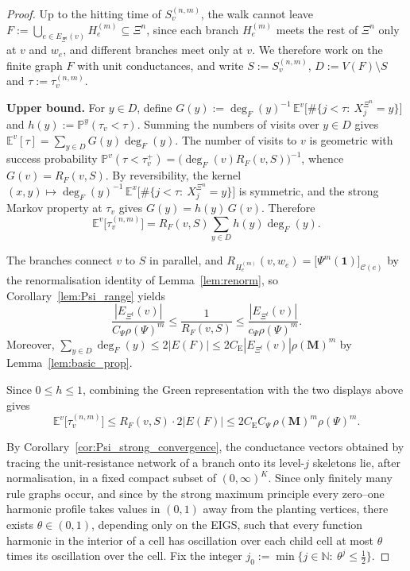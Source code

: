 \documentclass{article}
\theoremstyle{plain}
\theoremstyle{definition}
\begin{document}
\begin{proof}
%

Up to the hitting time of $S_v^{(n,m)}$, the walk cannot leave $F:=\bigcup_{e\in E_{\Xi^{t}}(v)} H_e^{(m)}\subseteq \Xi^n$, since each branch $H_e^{(m)}$ meets the rest of $\Xi^n$ only at $v$ and $w_e$, and different branches meet only at $v$.
We therefore work on the finite graph $F$ with unit conductances, and write $S:=S_v^{(n,m)}$, $D:=V(F)\setminus S$ and $\tau:=\tau_v^{(n,m)}$.

\textbf{Upper bound.}
For $y\in D$, define $G(y):=\deg_F(y)^{-1}\,\mathbb E^v\big[\#\{j<\tau:\ X_j^{\Xi^n}=y\}\big]$ and $h(y):=\mathbb P^y(\tau_v<\tau)$.
Summing the numbers of visits over $y\in D$ gives $\mathbb E^v[\tau]=\sum_{y\in D}G(y)\deg_F(y)$.
The number of visits to $v$ is geometric with success probability $\mathbb P^v(\tau<\tau_v^+)=\big(\deg_F(v)R_F(v,S)\big)^{-1}$, whence $G(v)=R_F(v,S)$.
By reversibility, the kernel $(x,y)\mapsto\deg_F(y)^{-1}\,\mathbb E^x\big[\#\{j<\tau:\ X_j^{\Xi^n}=y\}\big]$ is symmetric, and the strong Markov property at $\tau_v$ gives $G(y)=h(y)\,G(v)$.
Therefore
\[
\mathbb E^v\big[\tau_v^{(n,m)}\big]
=
R_F(v,S)\sum_{y\in D}h(y)\deg_F(y).
\]


The branches connect $v$ to $S$ in parallel, and $R_{H_e^{(m)}}(v,w_e)=\big[\Psi^{m}(\mathbf 1)\big]_{\mathscr C(e)}$ by the renormalisation identity of Lemma~\ref{lem:renorm}, so Corollary~\ref{lem:Psi_range} yields
\[
\frac{|E_{\Xi^{t}}(v)|}{C_{\Psi}\rho(\Psi)^m}
\le
\frac{1}{R_F(v,S)}
\le
\frac{|E_{\Xi^{t}}(v)|}{c_{\Psi}\rho(\Psi)^m}.
\]
Moreover, $\sum_{y\in D}\deg_F(y)\le 2|E(F)|\le 2C_{\mathrm E}|E_{\Xi^{t}}(v)|\rho(\mathbf M)^m$ by Lemma~\ref{lem:basic_prop}.


Since $0\le h\le 1$, combining the Green representation with the two displays above gives
\[
\mathbb E^v\big[\tau_v^{(n,m)}\big]
\le
R_F(v,S)\cdot 2|E(F)|
\le
2C_{\mathrm E}C_{\Psi}\,\rho(\mathbf M)^m\rho(\Psi)^m.
\]


By Corollary~\ref{cor:Psi_strong_convergence}, the conductance vectors obtained by tracing the unit-resistance network of a branch onto its level-$j$ skeletons lie, after normalisation, in a fixed compact subset of $(0,\infty)^K$.
Since only finitely many rule graphs occur, and since by the strong maximum principle every zero--one harmonic profile takes values in $(0,1)$ away from the planting vertices, there exists $\theta\in(0,1)$, depending only on the EIGS, such that every function harmonic in the interior of a cell has oscillation over each child cell at most $\theta$ times its oscillation over the cell.
Fix the integer $j_0:=\min\{j\in\mathbb N:\ \theta^{j}\le\tfrac12\}$.


\end{proof}
\end{document}
